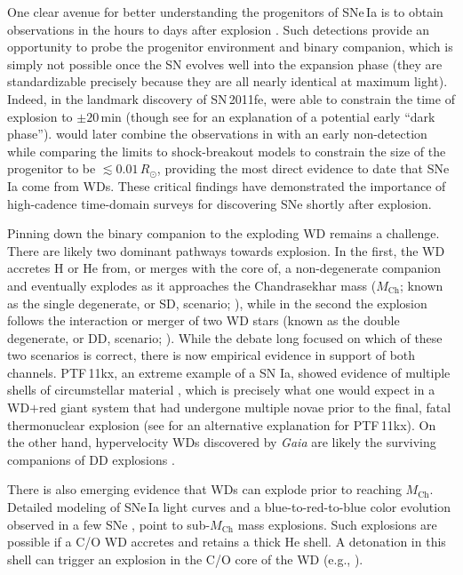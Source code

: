 \documentclass[twocolumn]{./aastex63}
\begin{document}
One clear avenue for better understanding the progenitors of SNe\,Ia is to
obtain observations in the hours to days after explosion \citep{Maoz14}. Such
detections provide an opportunity to probe the progenitor environment and
binary companion, which is simply not possible once the SN evolves well into
the expansion phase (they are standardizable precisely because they are all
nearly identical at maximum light). Indeed, in the landmark discovery of
SN\,2011fe, \citet{Nugent11} were able to constrain the time of explosion to
$\pm 20$\,min (though see \citealt{Piro13,Piro14} for an explanation of a
potential early ``dark phase''). \citet{Bloom12a} would later combine the
observations in \citet{Nugent11} with an early non-detection while comparing
the limits to shock-breakout models to constrain the size of the progenitor to
be $\lesssim 0.01\,R_\odot$, providing the most direct evidence to date that
SNe\,Ia come from WDs. These critical findings have demonstrated the importance
of high-cadence time-domain surveys for discovering SNe shortly after
explosion.

Pinning down the binary companion to the exploding WD remains a challenge.
There are likely two dominant pathways towards explosion. In the first, the WD
accretes H or He from, or merges with the core of, a non-degenerate companion
and eventually explodes as it approaches the Chandrasekhar mass
($M_\mathrm{Ch}$; known as the single degenerate, or SD, scenario;
\citealt{Whelan73}), while in the second the explosion follows the interaction
or merger of two WD stars (known as the double degenerate, or DD, scenario;
\citealt{Webbink84}). While the debate long focused on which of these two
scenarios is correct, there is now empirical evidence in support of both
channels. PTF\,11kx, an extreme example of a SN Ia, showed evidence of
multiple shells of circumstellar material \citep{Dilday12}, which is precisely
what one would expect in a WD$+$red giant system that had undergone multiple
novae prior to the final, fatal thermonuclear explosion (see \citealt{Soker13}
for an alternative explanation for PTF\,11kx). On the other hand,
hypervelocity WDs discovered by \textit{Gaia} are likely the surviving
companions of DD explosions \citep{Shen18}.

There is also emerging evidence that WDs can explode prior to reaching
$M_\mathrm{Ch}$. Detailed modeling of SNe\,Ia light curves \citep{Scalzo14a}
and a blue-to-red-to-blue color evolution observed in a few SNe
\citep{Jiang17,De19,Bulla20}, point to sub-$M_\mathrm{Ch}$ mass
explosions. Such explosions are possible if a C/O WD accretes and retains a
thick He shell. A detonation in this shell can trigger an explosion in the C/O
core of the WD (e.g., \citealt{Nomoto82,Nomoto82a}).
\end{document}
